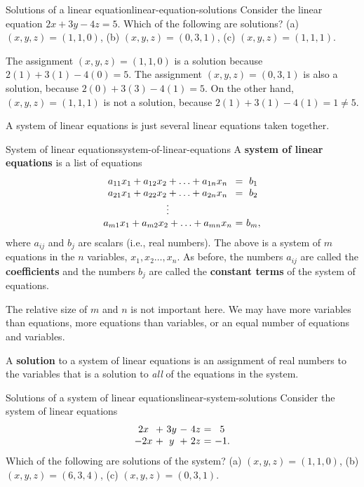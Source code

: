 \begin{example}{Solutions of a linear equation}{linear-equation-solutions}
  Consider the linear equation $2x+3y-4z=5$. Which of the following
  are solutions? (a) $(x,y,z)=(1,1,0)$, (b) $(x,y,z)=(0,3,1)$, (c)
  $(x,y,z)=(1,1,1)$.
\end{example}

\begin{solution}
  The assignment $(x,y,z) = (1,1,0)$ is a solution because
  $2(1)+3(1)-4(0) = 5$. The assignment $(x,y,z) = (0,3,1)$ is also a
  solution, because $2(0) + 3(3) - 4(1) = 5$. On the other hand,
  $(x,y,z) = (1,1,1)$ is not a solution, because
  $2(1) + 3(1)-4(1) = 1 \neq 5$.
\end{solution}

A system of linear equations is just several linear equations taken together.

\begin{definition}{System of linear equations}{system-of-linear-equations}
A \textbf{system of linear equations} is a list of equations
\begin{equation*}
\begin{array}{c@{~}c@{~}c}
a_{11}x_1+a_{12}x_2+\ldots+a_{1n}x_n&=&b_1 \\
a_{21}x_1+a_{22}x_2+\ldots+a_{2n}x_n&=&b_2 \\
\vdots \\
a_{m1}x_1+a_{m2}x_2+\ldots+a_{mn}x_n&=&b_m,
\end{array}
\end{equation*}
where $a_{ij}$ and $b_j$ are scalars (i.e., real numbers). The above
is a system of $m$ equations in the $n$ variables,
$x_1,x_2\ldots,x_n$.  As before, the numbers $a_{ij}$ are
called the \textbf{coefficients} and the numbers
$b_j$ are called the \textbf{constant terms} of
the system of equations.
\end{definition}

The relative size of $m$ and $n$ is not important here. We may have
more variables than equations, more equations than variables, or an
equal number of equations and variables.

A \textbf{solution} to a
system of linear equations is an assignment of real numbers to the
variables that is a solution to {\em all} of the equations in the
system.

\begin{example}{Solutions of a system of linear equations}{linear-system-solutions}
  Consider the system of linear equations
  \begin{equation*}
    \begin{array}{c@{~}c@{~}c@{~}c@{~}c@{~}c@{~}c}
      2x&+&3y&-&4z &=& 5 \\
      -2x&+&y&+&2z &=& -1.
    \end{array}
  \end{equation*}
  Which of the following are solutions of the system? (a)
  $(x,y,z)=(1,1,0)$, (b) $(x,y,z)=(6,3,4)$, (c) $(x,y,z)=(0,3,1)$.
\end{example}

